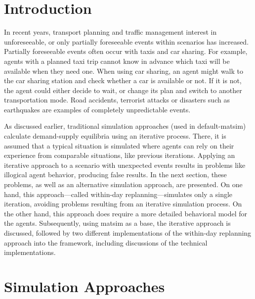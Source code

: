 \section{Introduction}
In recent years, transport planning and traffic management interest in unforeseeable, or only partially foreseeable events within scenarios has increased. Partially foreseeable events often occur with taxis and car sharing. For example, agents with a planned taxi trip cannot know in advance which taxi will be available when they need one. When using car sharing, an agent might walk to the car sharing station and check whether a car is available or not. If it is not, the agent could either decide to wait, or change its plan and switch to another transportation mode. Road accidents, terrorist attacks or disasters such as earthquakes are examples of completely unpredictable events.

As discussed earlier, traditional simulation approaches (used in default-\gls{matsim}) calculate demand-supply equilibria using an iterative process. There, it is assumed that a typical situation is simulated where agents can rely on their experience from comparable situations, like previous iterations. Applying an iterative approach to a scenario with unexpected events results in problems like illogical agent behavior, producing false results. In the next section, these problems, as well as an alternative simulation approach, are presented. On one hand, this approach---called within-day replanning---simulates only a single iteration, avoiding problems resulting from an iterative simulation process. On the other hand, this approach does require a more detailed behavioral model for the agents. Subsequently, using \gls{matsim} as a base, the iterative approach is discussed, followed by two different implementations of the within-day replanning approach into the \gls{framework}, including discussions of the technical implementations.

\section{Simulation Approaches} 
\label{sec:SimulationApproaches}

